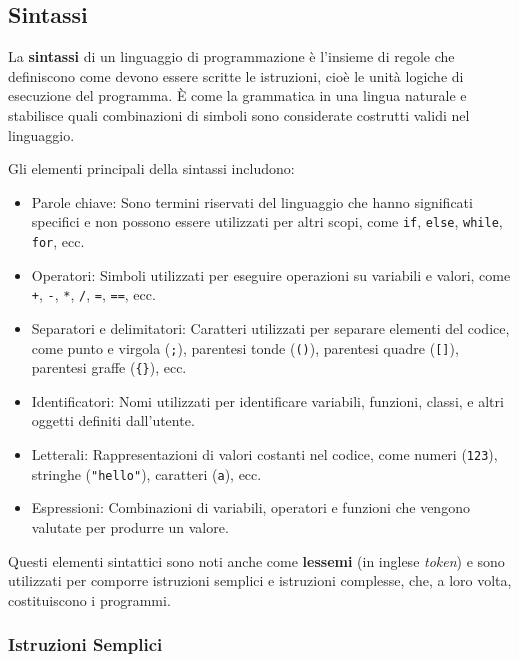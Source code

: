 \documentclass[
  letterpaper,
  DIV=11,
  numbers=noendperiod]{scrreprt}
\providecommand{\tightlist}{%
  \setlength{\itemsep}{0pt}\setlength{\parskip}{0pt}}\usepackage{longtable,booktabs,array}
\begin{document}
\subsection{Sintassi}\label{sintassi}

La \textbf{sintassi} di un linguaggio di programmazione è l'insieme di
regole che definiscono come devono essere scritte le istruzioni, cioè le
unità logiche di esecuzione del programma. È come la grammatica in una
lingua naturale e stabilisce quali combinazioni di simboli sono
considerate costrutti validi nel linguaggio.

Gli elementi principali della sintassi includono:

\begin{itemize}
\tightlist
\item
  Parole chiave: Sono termini riservati del linguaggio che hanno
  significati specifici e non possono essere utilizzati per altri scopi,
  come \texttt{if}, \texttt{else}, \texttt{while}, \texttt{for}, ecc.
\item
  Operatori: Simboli utilizzati per eseguire operazioni su variabili e
  valori, come \texttt{+}, \texttt{-}, \texttt{*}, \texttt{/},
  \texttt{=}, \texttt{==}, ecc.
\item
  Separatori e delimitatori: Caratteri utilizzati per separare elementi
  del codice, come punto e virgola (\texttt{;}), parentesi tonde
  (\texttt{()}), parentesi quadre (\texttt{{[}{]}}), parentesi graffe
  (\texttt{\{\}}), ecc.
\item
  Identificatori: Nomi utilizzati per identificare variabili, funzioni,
  classi, e altri oggetti definiti dall'utente.
\item
  Letterali: Rappresentazioni di valori costanti nel codice, come numeri
  (\texttt{123}), stringhe (\texttt{"hello"}), caratteri
  (\texttt{\textquotesingle{}a\textquotesingle{}}), ecc.
\item
  Espressioni: Combinazioni di variabili, operatori e funzioni che
  vengono valutate per produrre un valore.
\end{itemize}

Questi elementi sintattici sono noti anche come \textbf{lessemi} (in
inglese \emph{token}) e sono utilizzati per comporre istruzioni semplici
e istruzioni complesse, che, a loro volta, costituiscono i programmi.

\subsubsection{Istruzioni Semplici}\label{istruzioni-semplici}
\end{document}

